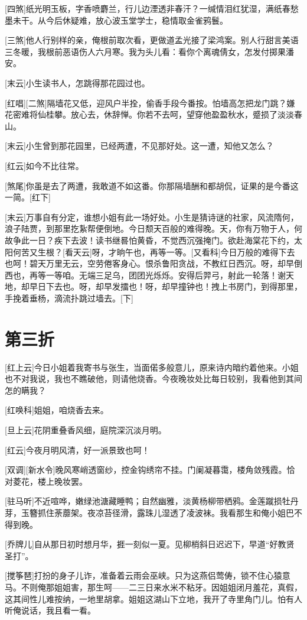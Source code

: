 \documentclass{book}
\newcommand\nchapter[1]{\chapter*{#1}\markboth{#1}{}\addcontentsline{toc}{chapter}{#1}}
\begin{document}
[四煞]纸光明玉板，字香喷麝兰，行儿边湮透非春汗？一缄情泪红犹湿，满纸春愁墨未干。从今后休疑难，放心波玉堂学士，稳情取金雀鸦鬟。

[三煞]他人行别样的亲，俺根前取次看，更做道孟光接了梁鸿案。别人行甜言美语三冬暖，我根前恶语伤人六月寒。我为头儿看：看你个离魂倩女，怎发付掷果潘安。

[末云]小生读书人，怎跳得那花园过也。

[红唱][二煞]隔墙花又低，迎风户半拴，偷香手段今番按。怕墙高怎把龙门跳？嫌花密难将仙桂攀。放心去，休辞惮。你若不去呵，望穿他盈盈秋水，蹙损了淡淡春山。

[末云]小生曾到那花园里，已经两遭，不见那好处。这一遭，知他又怎么？

[红云]如今不比往常。

[煞尾]你虽是去了两遭，我敢道不如这番。你那隔墙酬和都胡侃，证果的是今番这一简。[红下]

[末云]万事自有分定，谁想小姐有此一场好处。小生是猜诗谜的社家，风流隋何，浪子陆贾，到那里扢紥帮便倒地。今日颓天百般的难得晚。天，你有万物于人，何故争此一日？疾下去波！读书继晷怕黄昏，不觉西沉强掩门。欲赴海棠花下约，太阳何苦又生根？[看天云]呀，才晌午也，再等一等。[又看科]今日万般的难得下去也呵！碧天万里无云，空劳倦客身心。恨杀鲁阳贪战，不教红日西沉。呀，却早倒西也，再等一等咱。无端三足乌，团团光烁烁。安得后羿弓，射此一轮落！谢天地，却早日下去也。呀，却早发擂也！呀，却早撞钟也！拽上书房门，到得那里，手挽着垂杨，滴流扑跳过墙去。[下]

\nchapter{第三折}

[红上云]今日小姐着我寄书与张生，当面偌多般意儿，原来诗内暗约着他来。小姐也不对我说，我也不瞧破他，则请他烧香。今夜晚妆处比每日较别，我看他到其间怎的瞒我？

[红唤科]姐姐，咱烧香去来。

[旦上云]花阴重叠香风细，庭院深沉淡月明。

[红云]今夜月明风清，好一派景致也呵！

[双调][新水令]晚风寒峭透窗纱，控金钩绣帘不挂。门阑凝暮霭，楼角敛残霞。恰对菱花，楼上晚妆罢。

[驻马听]不近喧哗，嫩绿池溏藏睡鸭；自然幽雅，淡黄杨柳带栖鸦。金莲蹴损牡丹芽，玉簪抓住荼蘼架。夜凉苔径滑，露珠儿湿透了凌波袜。我看那生和俺小姐巴不得到晚。

[乔牌儿]自从那日初时想月华，捱一刻似一夏。见柳梢斜日迟迟下，早道``好教贤圣打''。

[搅筝琶]打扮的身子儿诈，准备着云雨会巫峡。只为这燕侣莺俦，锁不住心猿意马。不则俺那姐姐害，那生呵——二三日来水米不粘牙。因姐姐闭月羞花，真假，这其间性儿难按纳，一地里胡拿。姐姐这湖山下立地，我开了寺里角门儿。怕有人听俺说话，我且看一看。
\end{document}
